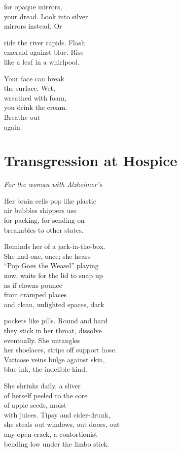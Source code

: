 \documentclass[twoside,10pt]{book}
\begin{document}
for opaque mirrors,\\
your dread. Look into silver\\
mirrors instead. Or

ride the river rapids. Flash\\
emerald against blue. Rise\\
like a leaf in a whirlpool.

Your face can break\\
the surface. Wet,\\
wreathed with foam,\\
you drink the cream.\\
Breathe out\\
again.


\clearpage
\section{Transgression at Hospice}

\emph{For the woman with Alzheimer's}

Her brain cells pop like plastic\\
air bubbles shippers use\\
for packing, for sending on\\
breakables to other states.

Reminds her of a jack-in-the-box.\\
She had one, once; she hears\\
``Pop Goes the Weasel'' playing\\
now, waits for the lid to snap up\\
as if clowns pounce\\
from cramped places\\
and clean, unlighted spaces, dark

pockets like pills. Round and hard\\
they stick in her throat, dissolve\\
eventually. She untangles\\
her shoelaces, strips off support hose.\\
Varicose veins bulge against skin,\\
blue ink, the indelible kind.

She shrinks daily, a sliver\\
of herself peeled to the core\\
of apple seeds, moist\\
with juices. Tipsy and cider-drunk,\\
she steals out windows, out doors, out\\
any open crack, a contortionist\\
bending low under the limbo stick.
\end{document}
